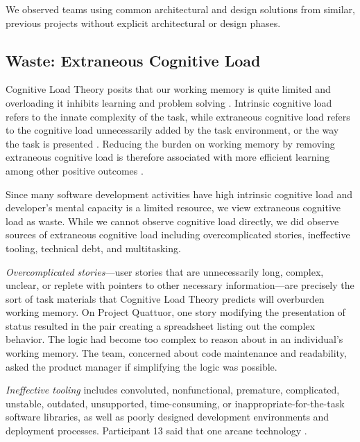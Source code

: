 We observed teams using common architectural and design solutions from similar, previous projects without explicit architectural or design phases.

\subsection{Waste: Extraneous Cognitive Load}

Cognitive Load Theory \cite{Sweller1988} posits that our working memory is quite limited and overloading it inhibits learning and problem solving \cite{Artino2008}. Intrinsic cognitive load refers to the innate complexity of the task, while extraneous cognitive load refers to the cognitive load unnecessarily added by the task environment, or the way the task is presented \cite{Sweller2010}. Reducing the burden on working memory by removing extraneous cognitive load is therefore associated with more efficient learning among other positive outcomes \cite{VanSweller2005}.

Since many software development activities have high intrinsic cognitive load and developer's mental capacity is a limited resource, we view extraneous cognitive load as waste. While we cannot observe cognitive load directly, we did observe sources of extraneous cognitive load including overcomplicated stories, ineffective tooling, technical debt, and multitasking.

\textit{Overcomplicated stories}---user stories that are unnecessarily long, complex, unclear, or replete with pointers to other necessary information---are precisely the sort of task materials that Cognitive Load Theory predicts will overburden working memory.  On Project Quattuor, one story modifying the presentation of status resulted in the pair creating a spreadsheet listing out the complex behavior. The logic had become too complex to reason about in an individual's working memory. The team, concerned about code maintenance and readability, asked the product manager if simplifying the logic was possible.

\textit{Ineffective tooling} includes convoluted, nonfunctional, premature, complicated, unstable, outdated, unsupported, time-consuming, or inappropriate-for-the-task software libraries, as well as poorly designed development environments and deployment processes. Participant 13 said that one arcane technology .

